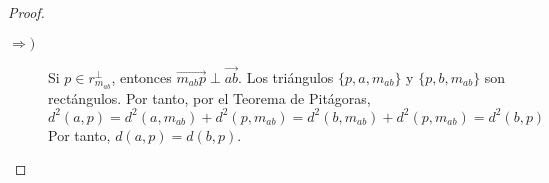 \begin{proof}\
    \begin{description}
        \item[$\Longrightarrow)$]
        \begin{comment}
         Veamos en primer lugar que $\|\vec{m_{ab}a}\|=\|\vec{m_{ab}b}\|$:
        \begin{gather*}
            \vec{m_{ab}a} = a-m_{ab}=a-a-\frac{1}{2}\vec{ab} = -\frac{1}{2}\vec{ab} \Longrightarrow ||\vec{m_{ab}a}|| = \frac{1}{2}\|\vec{ab}\|\\
            \vec{m_{ab}b} = b-m_{ab}=b-a-\frac{1}{2}\vec{ab} = \vec{ab}-\frac{1}{2}\vec{ab} = \frac{1}{2}\vec{ab} \Longrightarrow ||\vec{m_{ab}b}|| = \frac{1}{2}\|\vec{ab}\|
        \end{gather*}
        
        
        Veamos ahora que $\vec{pm_{ab}}\perp \vec{m_{ab}a}$. Para ello, vemos que $\vec{m_{ab}a}\in \vec{r}$:
        \begin{equation*}
            \vec{m_{ab}a}=a-m_{ab}=a-a-\frac{1}{2}\vec{ab}=-\frac{1}{2}\vec{ab}\in \cc{L}\{\vec{ab}\}
        \end{equation*}
        Análogamente, tenemos que $\vec{m_{ab}b}\in \vec{r}$. Además, tenemos que $p,m_{ab}\in r_{m_{ab}}^\perp$, por lo que $\vec{m_{ab}p}\in \vec{r}^\perp$. Por tanto, por definición de subespacio ortogonal, tenemos que $\vec{m_{ab}p}\perp \vec{m_{ab}a},\vec{m_{ab}b}$.

        Por tanto, por el Teorema de Pitágoras, tenemos que:
        \begin{equation*}
            \|\vec{pa}\|^2 = \|\vec{m_{ab}p}\|^2 + \|\vec{m_{ab}a}\|^2 \AstIg \|\vec{m_{ab}p}\|^2 + \|\vec{m_{ab}b}\|^2 = \|\vec{pb}\|^2
        \end{equation*}
        donde en $(\ast)$ he aplicado que $\|\vec{m_{ab}a}\|=\|\vec{m_{ab}b}\|$. Por tanto, tenemos que $\|\vec{pa}\|=\|\vec{pb}\|$, por lo que:
        \begin{equation*}
            d(a,p)=\|a-p\| = \|\vec{pa}\|=\|\vec{pb}\| = \|b-p\| = d(b,p)
        \end{equation*}
        \end{comment}

        Si $p\in r_{m_{ab}}^\perp$, entonces $\vec{m_{ab}p}\perp \vec{ab}$. Los triángulos $\{p,a,m_{ab}\}$ y $\{p,b,m_{ab}\}$ son rectángulos. Por tanto, por el Teorema de Pitágoras,
        \begin{equation*}
            d^2(a,p) = d^2(a,m_{ab}) + d^2(p,m_{ab}) = d^2(b,m_{ab}) + d^2(p,m_{ab})
            = d^2(b,p)
        \end{equation*}
        Por tanto, $d(a,p)=d(b,p)$.
        

\end{description}
\end{proof}
